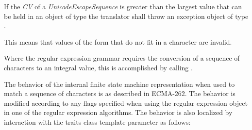 \pnum
{}%
If the \textit{CV} of a \textit{UnicodeEscapeSequence} is greater than the largest
value that can be held in an object of type  the translator shall
throw an exception object of type .
\begin{note}
This means that values of the form  that do not fit in
a character are invalid.
\end{note}

\pnum
Where the regular expression grammar requires the conversion of a sequence of characters
to an integral value, this is accomplished by calling .

\pnum
{}%
The behavior of the internal finite state machine representation when used to match a
sequence of characters is as described in ECMA-262.
The behavior is modified according
to any  flags specified when using the regular expression
object in one of the regular expression algorithms. The behavior is also
localized by interaction with the traits class template parameter as follows:
